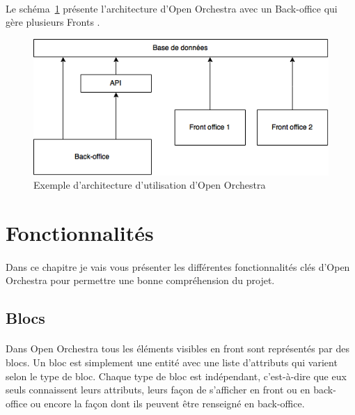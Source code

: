 	    \paragraph{}	
		Le schéma~\ref{architecture} présente l'architecture d'Open Orchestra avec un \og Back-office \fg{} qui gère plusieurs \og Fronts \fg{}.
		\begin{figure}[H]
        \begin{center}
          \includegraphics[scale=0.75]{images/architecture_open_orchestra}
        \end{center}
        \caption{Exemple d'architecture d'utilisation d'Open Orchestra}
        \label{architecture}
      \end{figure}

   
\section{Fonctionnalités}
	    \paragraph{}
	    Dans ce chapitre je vais vous présenter les différentes fonctionnalités clés d'Open Orchestra pour permettre une bonne compréhension du projet.
	      \subsection{Blocs}
	        \label{Blocs}  
	       \paragraph{}
	      Dans Open Orchestra tous les éléments visibles en front sont représentés par des blocs. Un bloc est simplement une entité avec une liste d'attributs qui varient selon le type de bloc. Chaque type de bloc est indépendant, c'est-à-dire que eux seuls connaissent leurs attributs, leurs façon de s'afficher en front ou en back-office ou encore la façon dont ils peuvent être renseigné en back-office. 

